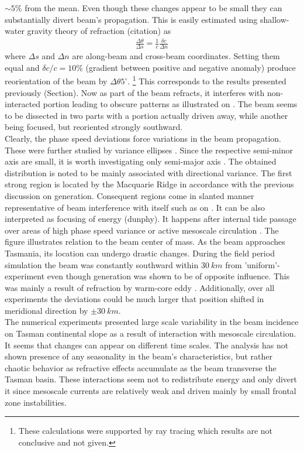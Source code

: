 \documentclass[12pt]{article}
\begin{document}
$\sim5\%$ from the mean. Even though these changes appear to be small they can substantially divert 
beam's propagation. This is easily estimated using shallow-water gravity theory of refraction 
(citation) as
\begin{align}
\frac{\Delta \theta}{\Delta s} = \frac{1}{c} \frac{\delta c}{\Delta n}
\end{align}
where $\Delta s$ and $\Delta n$ are along-beam and cross-beam coordinates. Setting them 
equal and $\delta c/c = 10\%$ (gradient between positive and negative anomaly) produce 
reorientation of the beam by $\Delta \theta 5^{\circ}$. \footnote{These calculations were supported by ray 
tracing which results are not conclusive and not given.} This corresponds to the results presented previously (Section). Now as part of the beam refracts, it interferes with non-interacted portion leading to 
obscure patterns as illustrated on . The beam seems to be dissected in 
two parts with a portion actually driven away, while another being focused, but reoriented strongly southward.\\
Clearly, the phase speed deviations force variations in the beam propagation. These were further studied by variance 
ellipses . Since the respective semi-minor axis are small, it is worth investigating only semi-major axis . The obtained distribution is noted to be mainly associated with directional 
variance. The first strong region is located by the Macquarie Ridge in accordance with the previous 
discussion on generation. Consequent regions come in slanted manner representative of beam interference with itself such as on . It can be also interpreted as focusing of energy (dunphy). It happens after internal tide passage over areas of high phase speed variance or active mesoscale circulation . The figure illustrates relation to the beam center of mass. As the beam approaches Tasmania, its location can undergo drastic changes. During the field period simulation the beam was constantly southward within $30~km$ from 'uniform'-experiment even though generation was shown to be of opposite influence. This was mainly a result of refraction by warm-core eddy . Additionally, over all experiments the deviations could be much larger that position shifted in meridional direction by $\pm 30~km$.\\
The numerical experiments presented large scale variability in the beam incidence on Tasman 
continental slope as a result of interaction with mesoscale circulation. It seems that changes can 
appear on different time scales. The analysis has not shown presence of any seasonality in the beam's characteristics, but rather chaotic behavior as refractive effects accumulate as the beam transverse the Tasman basin. These 
interactions seem not to redistribute energy and only divert it since mesoscale currents are 
relatively weak and driven mainly by small frontal zone instabilities.
\end{document}
